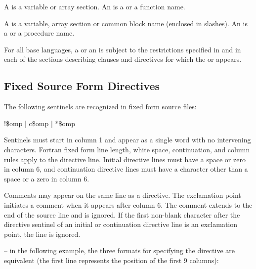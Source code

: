 \ccppspecificstart
A  is a variable or array section. An 
 is a  or a function name.
\ccppspecificend

\fortranspecificstart
A  is a variable, array section or common block name 
(enclosed in slashes). An  is a  
or a procedure name.
\fortranspecificend

For all base languages, a   or an 
is subject to the restrictions specified in  
and in each of the sections describing clauses and directives for which 
the  or  appears.






\pagebreak
\vspace{2\baselineskip}
\fortranspecificstart
\vspace{-3\baselineskip}
\subsection{Fixed Source Form Directives}
\label{subsec:Fixed Source Form Directives}
The following sentinels are recognized in fixed form source files:

\begin{boxedcode}
!\$omp \textnormal{|} c\$omp \textnormal{|} *\$omp
\end{boxedcode}

Sentinels must start in column 1 and appear as a single word with no intervening 
characters. Fortran fixed form line length, white space, continuation, and column rules 
apply to the directive line. Initial directive lines must have a space or zero in column 6, 
and continuation directive lines must have a character other than a space or a zero in 
column 6.

Comments may appear on the same line as a directive. The exclamation point initiates a 
comment when it appears after column 6. The comment extends to the end of the source 
line and is ignored. If the first non-blank character after the directive sentinel of an 
initial or continuation directive line is an exclamation point, the line is ignored.

\notestart
\noteheader – in the following example, the three formats for specifying the directive are 
equivalent (the first line represents the position of the first 9 columns):


